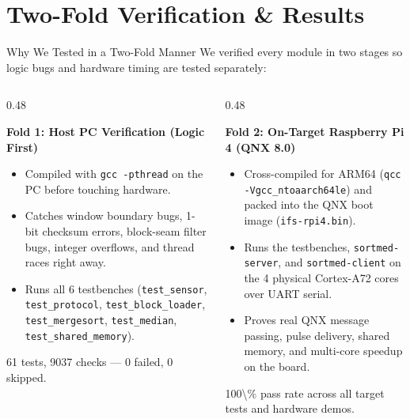 \section{Two-Fold Verification \& Results}

\begin{frame}{Why We Tested in a Two-Fold Manner}
  \smalltext\compactitem
  We verified every module in two stages so logic bugs and hardware timing are tested separately:
  \begin{columns}[t, onlytextwidth]
    \begin{column}{0.48\textwidth}
      \begin{highlight}
        \textbf{Fold 1: Host PC Verification (Logic First)}
      \end{highlight}
      \begin{itemize}
        \item Compiled with \texttt{gcc -pthread} on the PC before touching hardware.
        \item Catches window boundary bugs, 1-bit checksum errors, block-seam filter bugs, integer overflows, and thread races right away.
        \item Runs all 6 testbenches (\texttt{test\_sensor}, \texttt{test\_protocol}, \texttt{test\_block\_loader}, \texttt{test\_mergesort}, \texttt{test\_median}, \texttt{test\_shared\_memory}).
      \end{itemize}
      \num{61 tests, 9037 checks — 0 failed, 0 skipped}.
    \end{column}
    \begin{column}{0.48\textwidth}
      \begin{tech}
        \textbf{Fold 2: On-Target Raspberry Pi 4 (QNX 8.0)}
      \end{tech}
      \begin{itemize}
        \item Cross-compiled for ARM64 (\texttt{qcc -Vgcc\_ntoaarch64le}) and packed into the QNX boot image (\texttt{ifs-rpi4.bin}).
        \item Runs the testbenches, \texttt{sortmed-server}, and \texttt{sortmed-client} on the 4 physical Cortex-A72 cores over UART serial.
        \item Proves real QNX message passing, pulse delivery, shared memory, and multi-core speedup on the board.
      \end{itemize}
      \num{100\% pass rate across all target tests and hardware demos}.
    \end{column}
  \end{columns}
\end{frame}

